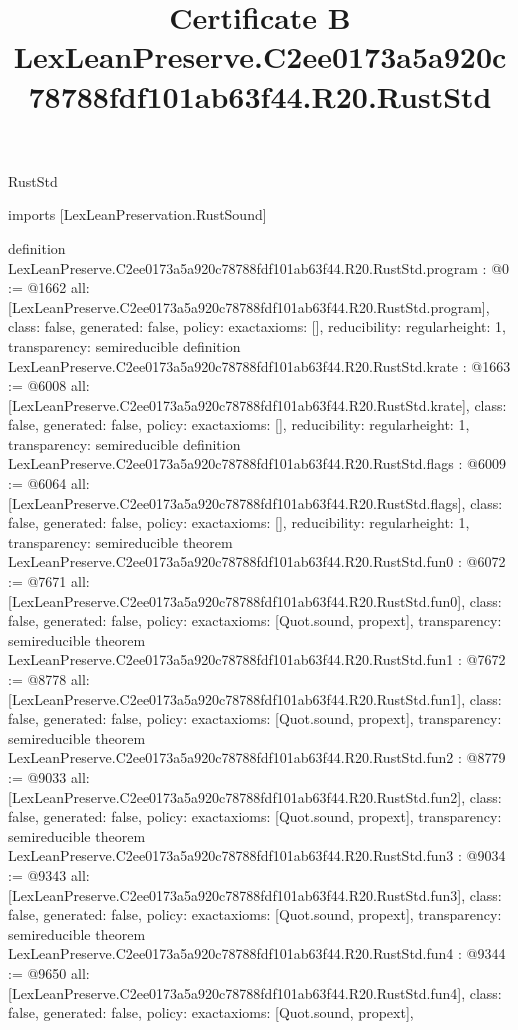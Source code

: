 \begin{lexlean}{RustStd}
\title{Certificate B LexLeanPreserve.C2ee0173a5a920c78788fdf101ab63f44.R20.RustStd}
\begin{coremodule}
imports [LexLeanPreservation.RustSound]

definition LexLeanPreserve.C2ee0173a5a920c78788fdf101ab63f44.R20.RustStd.program : @0 := @1662 {
  all: [LexLeanPreserve.C2ee0173a5a920c78788fdf101ab63f44.R20.RustStd.program],
  class: false,
  generated: false,
  policy: exact{axioms: []},
  reducibility: regular{height: 1},
  transparency: semireducible
}
definition LexLeanPreserve.C2ee0173a5a920c78788fdf101ab63f44.R20.RustStd.krate : @1663 := @6008 {
  all: [LexLeanPreserve.C2ee0173a5a920c78788fdf101ab63f44.R20.RustStd.krate],
  class: false,
  generated: false,
  policy: exact{axioms: []},
  reducibility: regular{height: 1},
  transparency: semireducible
}
definition LexLeanPreserve.C2ee0173a5a920c78788fdf101ab63f44.R20.RustStd.flags : @6009 := @6064 {
  all: [LexLeanPreserve.C2ee0173a5a920c78788fdf101ab63f44.R20.RustStd.flags],
  class: false,
  generated: false,
  policy: exact{axioms: []},
  reducibility: regular{height: 1},
  transparency: semireducible
}
theorem LexLeanPreserve.C2ee0173a5a920c78788fdf101ab63f44.R20.RustStd.fun0 : @6072 := @7671 {
  all: [LexLeanPreserve.C2ee0173a5a920c78788fdf101ab63f44.R20.RustStd.fun0],
  class: false,
  generated: false,
  policy: exact{axioms: [Quot.sound, propext]},
  transparency: semireducible
}
theorem LexLeanPreserve.C2ee0173a5a920c78788fdf101ab63f44.R20.RustStd.fun1 : @7672 := @8778 {
  all: [LexLeanPreserve.C2ee0173a5a920c78788fdf101ab63f44.R20.RustStd.fun1],
  class: false,
  generated: false,
  policy: exact{axioms: [Quot.sound, propext]},
  transparency: semireducible
}
theorem LexLeanPreserve.C2ee0173a5a920c78788fdf101ab63f44.R20.RustStd.fun2 : @8779 := @9033 {
  all: [LexLeanPreserve.C2ee0173a5a920c78788fdf101ab63f44.R20.RustStd.fun2],
  class: false,
  generated: false,
  policy: exact{axioms: [Quot.sound, propext]},
  transparency: semireducible
}
theorem LexLeanPreserve.C2ee0173a5a920c78788fdf101ab63f44.R20.RustStd.fun3 : @9034 := @9343 {
  all: [LexLeanPreserve.C2ee0173a5a920c78788fdf101ab63f44.R20.RustStd.fun3],
  class: false,
  generated: false,
  policy: exact{axioms: [Quot.sound, propext]},
  transparency: semireducible
}
theorem LexLeanPreserve.C2ee0173a5a920c78788fdf101ab63f44.R20.RustStd.fun4 : @9344 := @9650 {
  all: [LexLeanPreserve.C2ee0173a5a920c78788fdf101ab63f44.R20.RustStd.fun4],
  class: false,
  generated: false,
  policy: exact{axioms: [Quot.sound, propext]},
}
\end{coremodule}
\end{lexlean}
